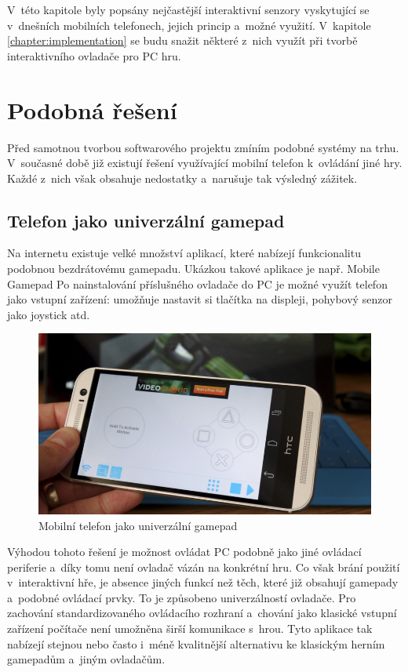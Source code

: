 \documentclass[thesis=B,czech,hidelinks]{FITthesis}[2012/06/26] %
\begin{document}
V~této kapitole byly popsány nejčastější interaktivní senzory vyskytující se v~dnešních mobilních telefonech, jejich princip a~možné využití. V~kapitole \ref{chapter:implementation} se budu snažit některé z~nich využít při tvorbě interaktivního ovladače pro PC hru. 

\chapter{Podobná řešení}

Před samotnou tvorbou softwarového projektu zmíním podobné systémy na trhu. V~současné době již existují řešení využívající mobilní telefon k~ovládání jiné hry. Každé z~nich však obsahuje nedostatky a~narušuje tak výsledný zážitek.

\section{Telefon jako univerzální gamepad}

Na internetu existuje velké množství aplikací, které nabízejí funkcionalitu podobnou bezdrátovému gamepadu. Ukázkou takové aplikace je např. Mobile Gamepad \cite{mobilegamepad} Po nainstalování příslušného ovladače do PC je možné využít telefon jako vstupní zařízení: umožňuje nastavit si tlačítka na displeji, pohybový senzor jako joystick atd.

\begin{figure}[h]
\includegraphics[width=\textwidth]{mobile_gamepad}
\caption{Mobilní telefon jako univerzální gamepad\cite{mobilegamepad}}
\end{figure}

Výhodou tohoto řešení je možnost ovládat PC podobně jako jiné ovládací periferie a~díky tomu není ovladač vázán na konkrétní hru. Co však brání použití v~interaktivní hře, je absence jiných funkcí než těch, které již obsahují gamepady a~podobné ovládací prvky. To je způsobeno univerzálností ovladače. Pro zachování standardizovaného ovládacího rozhraní a~chování jako klasické vstupní zařízení počítače není umožněna širší komunikace s~hrou. Tyto aplikace tak nabízejí stejnou nebo často i~méně kvalitnější alternativu ke klasickým herním gamepadům a~jiným ovladačům. 
\end{document}
